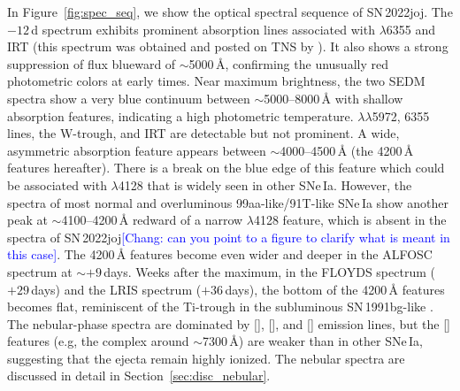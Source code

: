 \documentclass[twocolumn]{aastex631}
\newcommand{\sn}{SN\,2022joj}
\newcommand{\chang}[1]{\textcolor{blue}{[Chang: #1]}}
\begin{document}
\begin{CJK*}{UTF8}{gbsn}
In Figure~\ref{fig:spec_seq}, we show the optical spectral sequence of \sn. The $-12$\,d spectrum exhibits prominent absorption lines associated with  $\lambda$6355 and  IRT (this spectrum was obtained and posted on TNS by \citealt{Newsome_2022TNSCR}). It also shows a strong suppression of flux blueward of $\sim$5000\,\r{A}, confirming the unusually red photometric colors at early times. Near maximum brightness, the two SEDM spectra show a very blue continuum between $\sim$5000--8000\,\r{A} with shallow absorption features, indicating a high photometric temperature.  $\lambda\lambda$5972, 6355 lines, the  W-trough, and  IRT are detectable but not prominent. A wide, asymmetric absorption feature appears between $\sim$4000--4500\,\r{A} (the 4200\,\r{A} features hereafter). There is a break on the blue edge of this feature which could be associated with  $\lambda$4128 that is widely seen in other SNe\,Ia. However, the spectra of most normal and overluminous 99aa-like/91T-like SNe\,Ia show another peak at $\sim$4100--4200\,\r{A} redward of a narrow  $\lambda$4128 feature, which is absent in the spectra of \sn \chang{can you point to a figure to clarify what is meant in this case}. The 4200\,\r{A} features become even wider and deeper in the ALFOSC spectrum at $\sim$$+9$\,days. Weeks after the maximum, in the FLOYDS spectrum ($+29$\,days) and the LRIS spectrum ($+36$\,days), the bottom of the 4200\,\r{A} features becomes flat, reminiscent of the Ti-trough in the subluminous SN\,1991bg-like \citep[91bg-like;][]{Filippenko_91bg_1992,Leibundgut_91bg_1993}. The nebular-phase spectra are dominated by [], [], and [] emission lines, but the [] features (e.g, the complex around $\sim$7300\,\r{A}) are weaker than in other SNe\,Ia, suggesting that the ejecta remain highly ionized. The nebular spectra are discussed in detail in Section~\ref{sec:disc_nebular}.


\end{CJK*}
\end{document}
